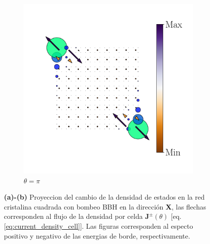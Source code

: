 \begin{figure}[h!]
\begin{minipage}[h!]{1.1\textwidth}
\begin{subfigure}[b!]{0.2 \textwidth}
         \end{subfigure}\hspace*{-0.5em}
          \begin{subfigure}[b!]{0.2 \textwidth}
             \caption*{$\theta = \pi$}
             \includegraphics[width=\textwidth]{Imagenes/Resultados_pump_Cuadrado/x/hoti_pomp_x_neg5.pdf}
         \end{subfigure}\hspace*{-0.5em}
     \end{minipage}\vspace*{-0.5em}
     
    \caption{\textbf{(a)-(b)} Proyeccion del cambio de la densidad de estados en la red cristalina cuadrada con bombeo BBH en la dirección \textbf{X}, las flechas corresponden al flujo de la densidad por celda $\mathbf{J}^{\pm}(\theta)$ [eq. \ref{eq:current_density_cell}]. Las figuras corresponden al especto positivo y negativo de las energias de borde, respectivamente.}
    \label{fig:Proy_pump_x}
\end{figure}